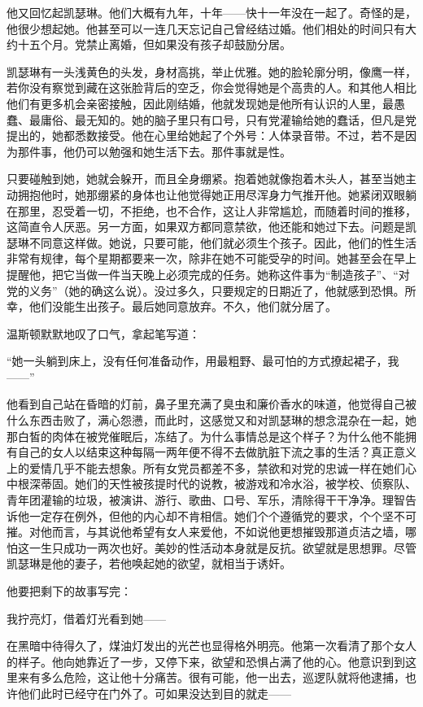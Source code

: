 他又回忆起凯瑟琳。他们大概有九年，十年------快十一年没在一起了。奇怪的是，他很少想起她。他甚至可以一连几天忘记自己曾经结过婚。他们相处的时间只有大约十五个月。党禁止离婚，但如果没有孩子却鼓励分居。

凯瑟琳有一头浅黄色的头发，身材高挑，举止优雅。她的脸轮廓分明，像鹰一样，若你没有察觉到藏在这张脸背后的空乏，你会觉得她是个高贵的人。和其他人相比他们有更多机会亲密接触，因此刚结婚，他就发现她是他所有认识的人里，最愚蠢、最庸俗、最无知的。她的脑子里只有口号，只有党灌输给她的蠢话，但凡是党提出的，她都悉数接受。他在心里给她起了个外号：人体录音带。不过，若不是因为那件事，他仍可以勉强和她生活下去。那件事就是性。

只要碰触到她，她就会躲开，而且全身绷紧。抱着她就像抱着木头人，甚至当她主动拥抱他时，她那绷紧的身体也让他觉得她正用尽浑身力气推开他。她紧闭双眼躺在那里，忍受着一切，不拒绝，也不合作，这让人非常尴尬，而随着时间的推移，这简直令人厌恶。另一方面，如果双方都同意禁欲，他还能和她过下去。问题是凯瑟琳不同意这样做。她说，只要可能，他们就必须生个孩子。因此，他们的性生活非常有规律，每个星期都要来一次，除非在她不可能受孕的时间。她甚至会在早上提醒他，把它当做一件当天晚上必须完成的任务。她称这件事为``制造孩子''、``对党的义务''（她的确这么说）。没过多久，只要规定的日期近了，他就感到恐惧。所幸，他们没能生出孩子。最后她同意放弃。不久，他们就分居了。

温斯顿默默地叹了口气，拿起笔写道：

``她一头躺到床上，没有任何准备动作，用最粗野、最可怕的方式撩起裙子，我------''

他看到自己站在昏暗的灯前，鼻子里充满了臭虫和廉价香水的味道，他觉得自己被什么东西击败了，满心怨懑，而此时，这感觉又和对凯瑟琳的想念混杂在一起，她那白皙的肉体在被党催眠后，冻结了。为什么事情总是这个样子？为什么他不能拥有自己的女人以结束这种每隔一两年便不得不去做肮脏下流之事的生活？真正意义上的爱情几乎不能去想象。所有女党员都差不多，禁欲和对党的忠诚一样在她们心中根深蒂固。她们的天性被孩提时代的说教，被游戏和冷水浴，被学校、侦察队、青年团灌输的垃圾，被演讲、游行、歌曲、口号、军乐，清除得干干净净。理智告诉他一定存在例外，但他的内心却不肯相信。她们个个遵循党的要求，个个坚不可摧。对他而言，与其说他希望有女人来爱他，不如说他更想摧毁那道贞洁之墙，哪怕这一生只成功一两次也好。美妙的性活动本身就是反抗。欲望就是思想罪。尽管凯瑟琳是他的妻子，若他唤起她的欲望，就相当于诱奸。

他要把剩下的故事写完：

我拧亮灯，借着灯光看到她------

在黑暗中待得久了，煤油灯发出的光芒也显得格外明亮。他第一次看清了那个女人的样子。他向她靠近了一步，又停下来，欲望和恐惧占满了他的心。他意识到到这里来有多么危险，这让他十分痛苦。很有可能，他一出去，巡逻队就将他逮捕，也许他们此时已经守在门外了。可如果没达到目的就走------

